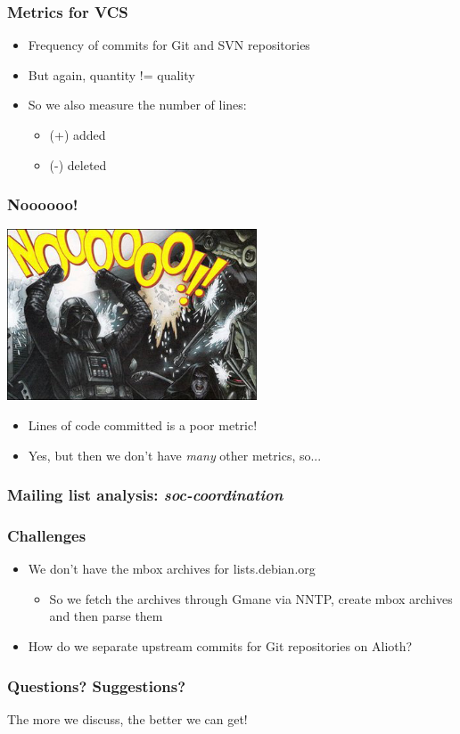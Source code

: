 \documentclass[compress]{beamer}
\begin{document}
\begin{frame}
    \frametitle{Metrics for VCS}
    \begin{itemize}
        \item Frequency of commits for Git and SVN repositories
        \pause
        \item But again, quantity != quality
        \pause
        \item So we also measure the number of lines:
        \begin{itemize}
            \item (+) added
            \item (-) deleted
        \end{itemize}
    \end{itemize}
\end{frame}

\begin{frame}
    \frametitle{Noooooo!}
        \begin{center}
            \includegraphics[height=2.0in]{vaderno.jpg}
        \end{center}
        \begin{itemize}
            \item Lines of code committed is a poor metric!
            \pause
            \item Yes, but then we don't have \textit{many} other metrics, so...
        \end{itemize}
\end{frame}

\begin{frame}
    \frametitle{Mailing list analysis: \textit{soc-coordination}}
\end{frame}

\begin{frame}
    \frametitle{Challenges}
    \begin{itemize}
    \item We don't have the mbox archives for lists.debian.org
        \begin{itemize}
        \pause
        \item So we fetch the archives through Gmane via NNTP, create mbox archives and then parse them
        \end{itemize}
    \pause
    \item How do we separate upstream commits for Git repositories on Alioth?
    \end{itemize}
\end{frame}

\begin{frame}
    \frametitle{Questions? Suggestions?}
    \begin{center}
    The more we discuss, the better we can get! 
    \end{center}
\end{frame}
\end{document}
